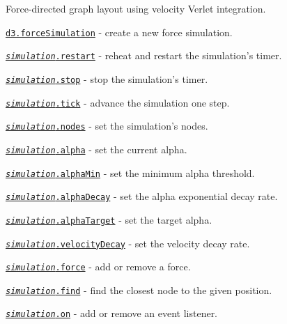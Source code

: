 Force-\/directed graph layout using velocity Verlet integration.


\begin{DoxyItemize}
\item \href{https://github.com/d3/d3-force/blob/master/README.md#forceSimulation}{\tt d3.\+force\+Simulation} -\/ create a new force simulation.
\item \href{https://github.com/d3/d3-force/blob/master/README.md#simulation_restart}{\tt {\itshape simulation}.restart} -\/ reheat and restart the simulation’s timer.
\item \href{https://github.com/d3/d3-force/blob/master/README.md#simulation_stop}{\tt {\itshape simulation}.stop} -\/ stop the simulation’s timer.
\item \href{https://github.com/d3/d3-force/blob/master/README.md#simulation_tick}{\tt {\itshape simulation}.tick} -\/ advance the simulation one step.
\item \href{https://github.com/d3/d3-force/blob/master/README.md#simulation_nodes}{\tt {\itshape simulation}.nodes} -\/ set the simulation’s nodes.
\item \href{https://github.com/d3/d3-force/blob/master/README.md#simulation_alpha}{\tt {\itshape simulation}.alpha} -\/ set the current alpha.
\item \href{https://github.com/d3/d3-force/blob/master/README.md#simulation_alphaMin}{\tt {\itshape simulation}.alpha\+Min} -\/ set the minimum alpha threshold.
\item \href{https://github.com/d3/d3-force/blob/master/README.md#simulation_alphaDecay}{\tt {\itshape simulation}.alpha\+Decay} -\/ set the alpha exponential decay rate.
\item \href{https://github.com/d3/d3-force/blob/master/README.md#simulation_alphaTarget}{\tt {\itshape simulation}.alpha\+Target} -\/ set the target alpha.
\item \href{https://github.com/d3/d3-force/blob/master/README.md#simulation_velocityDecay}{\tt {\itshape simulation}.velocity\+Decay} -\/ set the velocity decay rate.
\item \href{https://github.com/d3/d3-force/blob/master/README.md#simulation_force}{\tt {\itshape simulation}.force} -\/ add or remove a force.
\item \href{https://github.com/d3/d3-force/blob/master/README.md#simulation_find}{\tt {\itshape simulation}.find} -\/ find the closest node to the given position.
\item \href{https://github.com/d3/d3-force/blob/master/README.md#simulation_on}{\tt {\itshape simulation}.on} -\/ add or remove an event listener.

\end{DoxyItemize}
